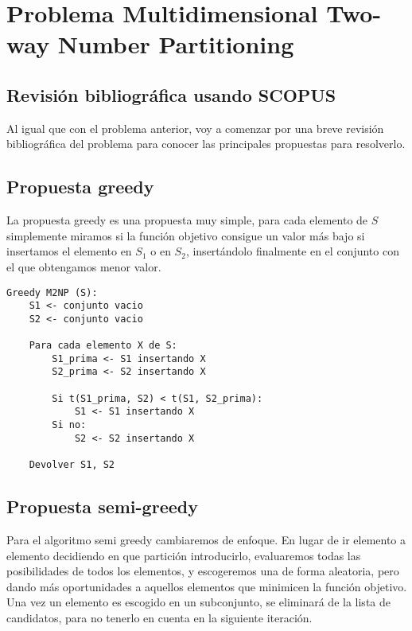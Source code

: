 \section{Problema Multidimensional Two-way Number Partitioning}

\subsection{Revisión bibliográfica usando SCOPUS}

Al igual que con el problema anterior, voy a comenzar por una breve revisión bibliográfica del problema para conocer las principales propuestas para resolverlo.



\subsection{Propuesta greedy}

La propuesta greedy es una propuesta muy simple, para cada elemento de $S$ simplemente miramos si la función objetivo consigue un valor más bajo si insertamos el elemento en $S_1$ o en $S_2$, insertándolo finalmente en el conjunto con el que obtengamos menor valor.

\begin{lstlisting}
Greedy M2NP (S):
	S1 <- conjunto vacio
	S2 <- conjunto vacio

	Para cada elemento X de S:
		S1_prima <- S1 insertando X
		S2_prima <- S2 insertando X

		Si t(S1_prima, S2) < t(S1, S2_prima):
			S1 <- S1 insertando X
		Si no:
			S2 <- S2 insertando X

	Devolver S1, S2
\end{lstlisting}


\subsection{Propuesta semi-greedy}

Para el algoritmo semi greedy cambiaremos de enfoque. En lugar de ir elemento a elemento decidiendo en que partición introducirlo, evaluaremos todas las posibilidades de todos los elementos, y escogeremos una de forma aleatoria, pero dando más oportunidades a aquellos elementos que minimicen la función objetivo. Una vez un elemento es escogido en un subconjunto, se eliminará de la lista de candidatos, para no tenerlo en cuenta en la siguiente iteración.

